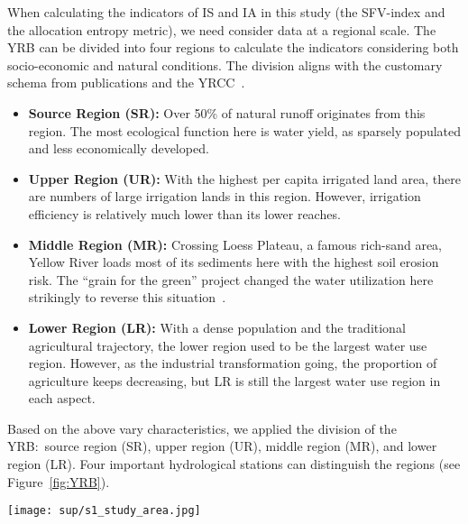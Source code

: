 When calculating the indicators of IS and IA in this study (the SFV-index and the allocation entropy metric), we need consider data at a regional scale.
The YRB can be divided into four regions to calculate the indicators considering both socio-economic and natural conditions.
The division aligns with the customary schema from publications and the YRCC~\cite{yellowriverwaterconservancycommission2010,wang2019c}.

\begin{itemize}
    \item \textbf{Source Region (SR):} Over 50\% of natural runoff originates from this region. The most ecological function here is water yield, as sparsely populated and less economically developed.
    \item \textbf{Upper Region (UR):} With the highest per capita irrigated land area, there are numbers of large irrigation lands in this region. However, irrigation efficiency is relatively much lower than its lower reaches.
    \item \textbf{Middle Region (MR):} Crossing Loess Plateau, a famous rich-sand area, Yellow River loads most of its sediments here with the highest soil erosion risk. The ``grain for the green'' project changed the water utilization here strikingly to reverse this situation~\cite{wu2020a}.
    \item \textbf{Lower Region (LR):} With a dense population and the traditional agricultural trajectory, the lower region used to be the largest water use region. However, as the industrial transformation going, the proportion of agriculture keeps decreasing, but LR is still the largest water use region in each aspect.
\end{itemize}

Based on the above vary characteristics, we applied the division of the YRB:\ source region (SR), upper region (UR), middle region (MR), and lower region (LR).
Four important hydrological stations can distinguish the regions (see Figure~\ref{fig:YRB}).

\begin{figure*}[!hbtp]
    \centering
    \texttt{[image: sup/s1\_study\_area.jpg]}
    \caption{
        The study area.
        \textbf{A.} Diagram of the YRB and the subdivision of the basin (SR:\ Source Region, UR:\ Upper Region, MR:\ Middle Region, DR:\ Downstream region).
        \textbf{B.} Profile of the main channel of the Yellow River. The hydrological stations control the SR, UR, MR and DR.\
        \textbf{C.} Typical landscapes in different regions in the YRB.\
    }\label{fig:YRB}
\end{figure*}


